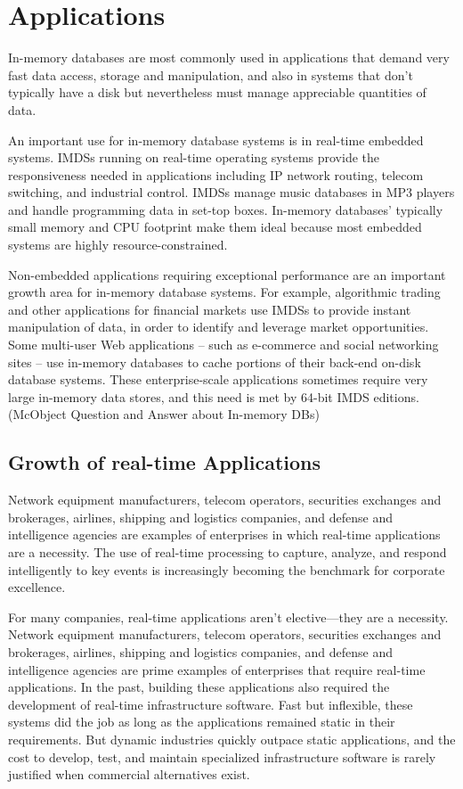 \documentclass[10pt]{article} %
\begin{document}
\section{Applications}

In-memory databases are most commonly used in applications that demand very fast data access, storage and manipulation, and also in systems that don’t typically have a disk but nevertheless must manage appreciable quantities of data.

An important use for in-memory database systems is in real-time embedded systems. IMDSs running on real-time operating systems provide the responsiveness needed in applications including IP network routing, telecom switching, and industrial control. IMDSs manage music databases in MP3 players and handle programming data in set-top boxes. In-memory databases’ typically small memory and CPU footprint make them ideal because most embedded systems are highly resource-constrained.

Non-embedded applications requiring exceptional performance are an important growth area for in-memory database systems. For example, algorithmic trading and other applications for financial markets use IMDSs to provide instant manipulation of data, in order to identify and leverage market opportunities. Some multi-user Web applications – such as e-commerce and social networking sites – use in-memory databases to cache portions of their back-end on-disk database systems. These enterprise-scale applications sometimes require very large in-memory data stores, and this need is met by 64-bit IMDS editions.(McObject Question and Answer about In-memory DBs)

\subsection{Growth of real-time Applications}

Network equipment manufacturers, telecom operators, securities exchanges and brokerages, airlines, shipping and logistics companies, and defense and intelligence agencies are examples of enterprises in which real-time applications are a necessity. The use of real-time processing to capture, analyze, and respond intelligently to key events is increasingly becoming the benchmark for corporate excellence.

For many companies, real-time applications aren’t elective—they are a necessity. Network equipment manufacturers, telecom operators, securities exchanges and brokerages, airlines, shipping and logistics companies, and defense and intelligence agencies are prime examples of enterprises that require real-time applications. In the past, building these applications also required the development of real-time infrastructure software. Fast but inflexible, these systems did the job as long as the applications remained static in their requirements. But dynamic industries quickly outpace static applications, and the cost to develop, test, and maintain  specialized infrastructure software is rarely justified when commercial alternatives exist.
\end{document}
